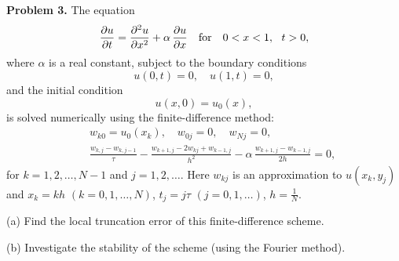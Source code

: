 \documentclass[10pt]{article}
\begin{document}

\vskip 0.5cm
\noindent
{\bf Problem 3.} The equation
\begin{equation}
\frac{\partial u}{\partial t}=\frac{\partial^{2}u}{\partial x^{2}}+\alpha \,
\frac{\partial u}{\partial x} \quad \hbox{for} \quad
0<x<1, \ \ t>0, \label{11}
\end{equation}
where $\alpha$ is a real constant, subject to the boundary conditions
\begin{equation}
u(0,t)=0, \quad u(1, t)=0,  \label{12}
\end{equation}
and the initial condition
\begin{equation}
u(x,0)=u_{0}(x),  \label{13}
\end{equation}
is solved numerically using the finite-difference method:
\begin{eqnarray}
&&w_{k0}=u_{0}(x_{k}), \quad w_{0j}=0, \quad w_{Nj}=0,   \nonumber \\
&&\frac{w_{k,j}-w_{k,j-1}}{\tau}-\frac{w_{k+1,j}-2w_{kj}+w_{k-1,j}}{h^{2}}
-\alpha \, \frac{w_{k+1,j}-w_{k-1,j}}{2h}=0,   \label{15}
\end{eqnarray}
for $k=1, 2, \dots , N-1$ and $j=1, 2, \dots$.
Here $w_{kj}$ is an approximation to $u(x_{k}, y_{j})$ and
$x_{k}=k h$ $(k=0,1,\dots,N)$, $t_{j}=j \tau$ $(j=0,1,\dots)$, $h=\frac{1}{N}$.

\vskip 0.2cm \noindent (a) Find the local truncation error of this
finite-difference scheme.

\vskip 0.2cm \noindent (b) Investigate the stability of the scheme
(using the Fourier method).
\end{document}
